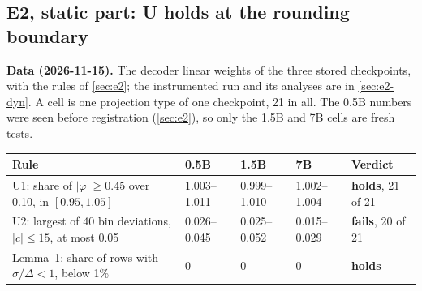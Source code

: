 \documentclass[11pt]{article}
\begin{document}
\subsection{E2, static part: U holds at the rounding boundary}\label{sec:e2-results}
\textbf{Data (2026-11-15).} The decoder linear weights of the three stored checkpoints, with the rules of \cref{sec:e2}; the instrumented run and its analyses are in \cref{sec:e2-dyn}. A cell is one projection type of one checkpoint, 21 in all. The 0.5B numbers were seen before registration (\cref{sec:e2}), so only the 1.5B and 7B cells are fresh tests.
\begin{center}\small
\begin{tabularx}{\linewidth}{@{}L l l l l@{}}
\toprule
Rule & 0.5B & 1.5B & 7B & Verdict\\
\midrule
U1: share of $|\varphi|\ge0.45$ over 0.10, in $[0.95,1.05]$ & 1.003--1.011 & 0.999--1.010 & 1.002--1.004 & \textbf{holds}, 21 of 21\\
U2: largest of 40 bin deviations, $|c|\le15$, at most 0.05 & 0.026--0.045 & 0.025--0.052 & 0.015--0.029 & \textbf{fails}, 20 of 21\\
Lemma~1: share of rows with $\sigma/\Delta<1$, below 1\% & 0 & 0 & 0 & \textbf{holds}\\
\bottomrule
\end{tabularx}
\end{center}
\end{document}
